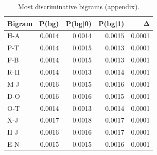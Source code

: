 \begin{table}
\caption{Most discriminative bigrams (appendix).}
\label{tab:top_bigrams}
\begin{tabular}{lrrrr}
\toprule
Bigram & P(bg) & P(bg|0) & P(bg|1) & Δ \\
\midrule
H-A & 0.0014 & 0.0014 & 0.0015 & 0.0001 \\
P-T & 0.0014 & 0.0015 & 0.0013 & 0.0001 \\
F-B & 0.0014 & 0.0015 & 0.0013 & 0.0001 \\
R-H & 0.0014 & 0.0013 & 0.0014 & 0.0001 \\
M-J & 0.0016 & 0.0015 & 0.0016 & 0.0001 \\
D-O & 0.0016 & 0.0016 & 0.0015 & 0.0001 \\
O-T & 0.0014 & 0.0013 & 0.0014 & 0.0001 \\
X-J & 0.0017 & 0.0018 & 0.0017 & 0.0001 \\
H-J & 0.0016 & 0.0016 & 0.0017 & 0.0001 \\
E-N & 0.0015 & 0.0015 & 0.0016 & 0.0001 \\
\bottomrule
\end{tabular}
\end{table}
